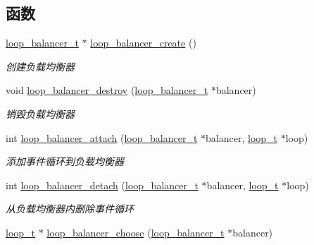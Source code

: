 \subsection*{函数}
\begin{DoxyCompactItemize}
\item 
\hyperlink{a00051_a649c7e850ab247b5f70ad27e335a129d_a649c7e850ab247b5f70ad27e335a129d}{loop\+\_\+balancer\+\_\+t} $\ast$ \hyperlink{a00106_ga9992a50e96839282c678e51bc11158d1_ga9992a50e96839282c678e51bc11158d1}{loop\+\_\+balancer\+\_\+create} ()
\begin{DoxyCompactList}\small\item\em 创建负载均衡器 \end{DoxyCompactList}\item 
void \hyperlink{a00106_ga2d702b5f965fe587fdaea3f5f9e2400c_ga2d702b5f965fe587fdaea3f5f9e2400c}{loop\+\_\+balancer\+\_\+destroy} (\hyperlink{a00051_a649c7e850ab247b5f70ad27e335a129d_a649c7e850ab247b5f70ad27e335a129d}{loop\+\_\+balancer\+\_\+t} $\ast$balancer)
\begin{DoxyCompactList}\small\item\em 销毁负载均衡器 \end{DoxyCompactList}\item 
int \hyperlink{a00106_ga2b3cf2cb63d914efe226e901a50d8b0a_ga2b3cf2cb63d914efe226e901a50d8b0a}{loop\+\_\+balancer\+\_\+attach} (\hyperlink{a00051_a649c7e850ab247b5f70ad27e335a129d_a649c7e850ab247b5f70ad27e335a129d}{loop\+\_\+balancer\+\_\+t} $\ast$balancer, \hyperlink{a00051_a9c3ad1cd2de83e09f3a7b59fa82c94ee_a9c3ad1cd2de83e09f3a7b59fa82c94ee}{loop\+\_\+t} $\ast$loop)
\begin{DoxyCompactList}\small\item\em 添加事件循环到负载均衡器 \end{DoxyCompactList}\item 
int \hyperlink{a00106_ga548ce0c2c624c4f4731a0f963d2ca42a_ga548ce0c2c624c4f4731a0f963d2ca42a}{loop\+\_\+balancer\+\_\+detach} (\hyperlink{a00051_a649c7e850ab247b5f70ad27e335a129d_a649c7e850ab247b5f70ad27e335a129d}{loop\+\_\+balancer\+\_\+t} $\ast$balancer, \hyperlink{a00051_a9c3ad1cd2de83e09f3a7b59fa82c94ee_a9c3ad1cd2de83e09f3a7b59fa82c94ee}{loop\+\_\+t} $\ast$loop)
\begin{DoxyCompactList}\small\item\em 从负载均衡器内删除事件循环 \end{DoxyCompactList}\item 
\hyperlink{a00051_a9c3ad1cd2de83e09f3a7b59fa82c94ee_a9c3ad1cd2de83e09f3a7b59fa82c94ee}{loop\+\_\+t} $\ast$ \hyperlink{a00072_ac025f218f22410cf0e60980bbd93c5e3_ac025f218f22410cf0e60980bbd93c5e3}{loop\+\_\+balancer\+\_\+choose} (\hyperlink{a00051_a649c7e850ab247b5f70ad27e335a129d_a649c7e850ab247b5f70ad27e335a129d}{loop\+\_\+balancer\+\_\+t} $\ast$balancer)

\end{DoxyCompactItemize}
